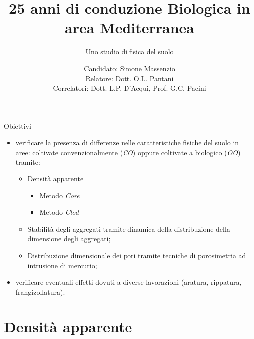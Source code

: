 \documentclass[10pt]{beamer}
\title[25 anni di conduzione Biologica in
    area Mediterranea. ] %
{ %
  25 anni di  conduzione Biologica  in
    area Mediterranea}
\subtitle[Uno studio di fisica del suolo]
{
  Uno studio di fisica del suolo
}
\author[Simone Massenzio]
{ 
  Candidato: Simone Massenzio \\
  Relatore: Dott. O.L. Pantani\\
  \vspace{0.1cm}
  Correlatori:
  Dott. L.P. D'Acqui, Prof. G.C. Pacini}
\institute[] { \emph{Dipartimento di Scienze della Produzioni Animali e
    dell'Ambiente\\
    Universit\`a degli studi di Firenze - UniFI\\}
  
}
\date{\displaydate{date}}
\begin{document}
{\1
  \begin{frame}[noframenumbering]%
    \titlepage
  \end{frame}}






\begin{frame}{Obiettivi}{}
  \large
  \begin{itemize}[<+->]
  \item verificare la presenza di differenze nelle caratteristiche
    fisiche del suolo in aree: coltivate convenzionalmente (\emph{CO})
    oppure coltivate a biologico (\emph{OO}) tramite:
    \begin{itemize}
    \item Densit\`a apparente
      \begin{itemize}
      \item Metodo \emph{Core}
      \item Metodo \emph{Clod}
      \end{itemize}
    \item Stabilit\`a degli aggregati tramite dinamica della
      distribuzione della dimensione degli aggregati;
    \item Distribuzione dimensionale dei pori tramite tecniche di
      porosimetria ad intrusione di mercurio;      
    \end{itemize}
  \item verificare eventuali effetti dovuti a diverse lavorazioni
    (aratura, rippatura, frangizollatura).
  \end{itemize}
\end{frame}

\section{Densit\`a apparente}
\end{document}
